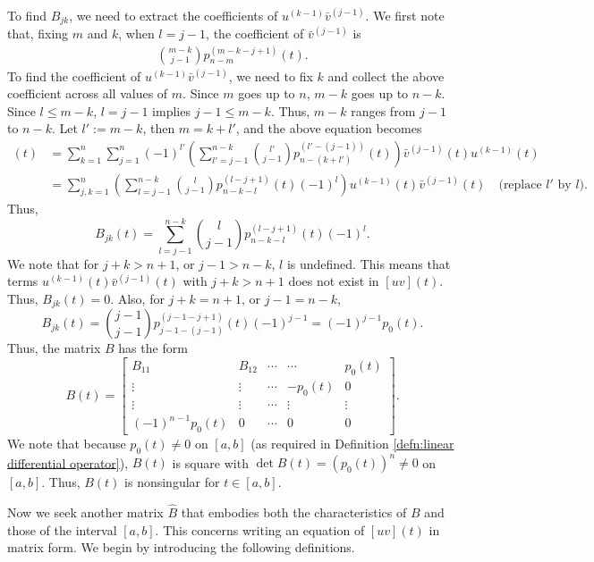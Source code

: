 \documentclass[11pt, oneside, a4paper]{article}
\begin{document}
To find $B_{jk}$, we need to extract the coefficients of $u^{(k-1)}\bar{v}^{(j-1)}$. We first note that, fixing $m$ and $k$, when $l=j-1$, the coefficient of $\bar{v}^{(j-1)}$ is
\begin{align*}
    \binom{m-k}{j-1}p_{n-m}^{(m-k-j+1)}(t).
\end{align*}
To find the coefficient of $u^{(k-1)}\bar{v}^{(j-1)}$, we need to fix $k$ and collect the above coefficient across all values of $m$. Since $m$ goes up to $n$, $m-k$ goes up to $n-k$. Since $l\leq m-k$, $l=j-1$ implies $j-1\leq m-k$. Thus, $m-k$ ranges from $j-1$ to $n-k$. Let $l':=m-k$, then $m=k+l'$, and the above equation becomes
\begin{align*}
    [uv](t) 
    &= \sum_{k=1}^n\sum_{j=1}^n (-1)^{l'}\left(\sum_{l'=j-1}^{n-k}\binom{l'}{j-1}p_{n-(k+l')}^{(l'-(j-1))}(t)\right)\bar{v}^{(j-1)}(t)u^{(k-1)}(t)\\
    &= \sum_{j,k=1}^n \left(\sum_{l=j-1}^{n-k}\binom{l}{j-1}p^{(l-j+1)}_{n-k-l}(t)(-1)^l\right)u^{(k-1)}(t)\bar{v}^{(j-1)}(t)\quad\mbox{(replace $l'$ by $l$)}.
\end{align*}
Thus,
\[B_{jk}(t) = \sum_{l=j-1}^{n-k}\binom{l}{j-1}p^{(l-j+1)}_{n-k-l}(t)(-1)^l.\]
We note that for $j+k>n+1$, or $j-1>n-k$, $l$ is undefined. This means that terms $u^{(k-1)}(t)\bar{v}^{(j-1)}(t)$ with $j+k>n+1$ does not exist in $[uv](t)$. Thus, $B_{jk}(t)=0$. Also, for $j+k=n+1$, or $j-1=n-k$,
\[B_{jk}(t) = \binom{j-1}{j-1}p^{(j-1-j+1)}_{j-1-(j-1)}(t)(-1)^{j-1} = (-1)^{j-1}p_0(t).\] 
Thus, the matrix $B$ has the form
\begin{equation}\label{eq:B(t)}
    B(t)=\begin{bmatrix}
        B_{11} & B_{12} & \cdots & \cdots & p_0(t)\\
        \vdots & \vdots & \cdots & -p_0(t) & 0\\
        \vdots & \vdots & \cdots & \vdots & \vdots\\
        (-1)^{n-1}p_0(t) & 0 & \cdots & 0 & 0
    \end{bmatrix}.
\end{equation}
We note that because $p_0(t)\neq 0$ on $[a,b]$ (as required in Definition \ref{defn:linear differential operator}), $B(t)$ is square with $\det B(t)=(p_0(t))^n\neq 0$ on $[a,b]$. Thus, $B(t)$ is nonsingular for $t\in [a,b]$.


Now we seek another matrix $\hat{B}$ that embodies both the characteristics of $B$ and those of the interval $[a,b]$. This concerns writing an equation of $[uv](t)$ in matrix form. We begin by introducing the following definitions.
\end{document}
